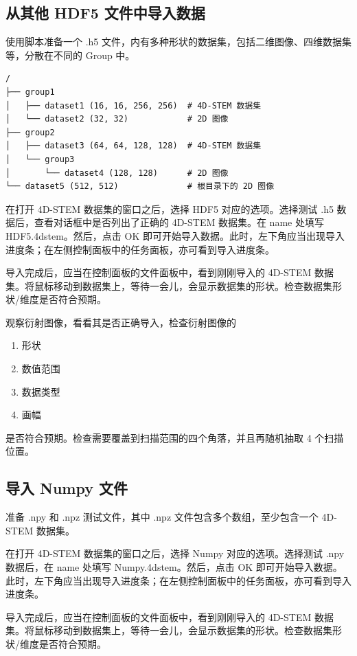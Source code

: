 \documentclass[a4paper,12pt]{report}	%
\begin{document}
\subsection{从其他 HDF5 文件中导入数据}

使用脚本准备一个 .h5 文件，内有多种形状的数据集，包括二维图像、四维数据集等，分散在不同的 Group 中。

\begin{verbatim}
/
├── group1
│   ├── dataset1 (16, 16, 256, 256)  # 4D-STEM 数据集
│   └── dataset2 (32, 32)            # 2D 图像
├── group2
│   ├── dataset3 (64, 64, 128, 128)  # 4D-STEM 数据集
│   └── group3
│       └── dataset4 (128, 128)      # 2D 图像
└── dataset5 (512, 512)              # 根目录下的 2D 图像
\end{verbatim}


在打开 4D-STEM 数据集的窗口之后，选择 HDF5 对应的选项。选择测试 .h5 数据后，查看对话框中是否列出了正确的 4D-STEM 数据集。在 name 处填写 HDF5.4dstem。然后，点击 OK 即可开始导入数据。此时，左下角应当出现导入进度条；在左侧控制面板中的任务面板，亦可看到导入进度条。

导入完成后，应当在控制面板的文件面板中，看到刚刚导入的 4D-STEM 数据集。将鼠标移动到数据集上，等待一会儿，会显示数据集的形状。检查数据集形状/维度是否符合预期。

观察衍射图像，看看其是否正确导入，检查衍射图像的
\begin{enumerate}
    \item 形状 
    \item 数值范围
    \item 数据类型 
    \item 画幅
\end{enumerate} 
是否符合预期。检查需要覆盖到扫描范围的四个角落，并且再随机抽取 4 个扫描位置。

\subsection{导入 Numpy 文件}

准备 .npy 和 .npz 测试文件，其中 .npz 文件包含多个数组，至少包含一个 4D-STEM 数据集。

在打开 4D-STEM 数据集的窗口之后，选择 Numpy 对应的选项。选择测试 .npy 数据后，在 name 处填写 Numpy.4dstem。然后，点击 OK 即可开始导入数据。此时，左下角应当出现导入进度条；在左侧控制面板中的任务面板，亦可看到导入进度条。

导入完成后，应当在控制面板的文件面板中，看到刚刚导入的 4D-STEM 数据集。将鼠标移动到数据集上，等待一会儿，会显示数据集的形状。检查数据集形状/维度是否符合预期。
\end{document}
